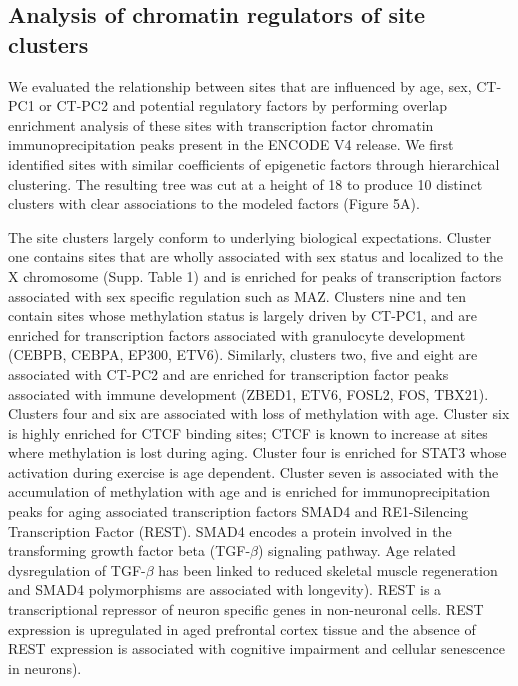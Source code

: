 \documentclass[sn-nature]{sn-jnl}
\begin{document}
{\begin{linenumbers}
\subsection{Analysis of chromatin regulators of site clusters}
We evaluated the relationship between sites that are influenced by age, sex, CT-PC1 or CT-PC2  and potential regulatory 
factors by performing overlap enrichment analysis of these sites with transcription factor chromatin immunoprecipitation 
peaks present in the ENCODE V4\cite{Davis2018-ha,ENCODE_Project_Consortium2012-oe} release. 
We first identified sites with similar coefficients of epigenetic factors through hierarchical clustering. 
The resulting tree was cut at a height of 18 to produce 10 distinct clusters with clear associations to the modeled factors (Figure 5A). 

The site clusters largely conform to underlying biological expectations. Cluster one contains sites 
that are wholly associated with sex status and localized to the X chromosome (Supp. Table 1) and is enriched for peaks of 
transcription factors associated with sex specific regulation such as MAZ\cite{Lopes-Ramos2020-ex}. 
Clusters nine and ten contain sites whose methylation status is largely driven by CT-PC1, and are enriched for 
transcription factors associated with granulocyte development (CEBPB, CEBPA, EP300, ETV6)\cite{Theilgaard-Monch2022-zw,Guerzoni2006-ii}. 
Similarly, clusters two, five and eight are associated with CT-PC2 and are enriched for 
transcription factor peaks associated with immune development (ZBED1, ETV6, FOSL2, FOS, TBX21). Clusters four and 
six are associated with loss of methylation with age. Cluster six is highly enriched for CTCF binding sites; CTCF 
is known to increase at sites where methylation is lost during aging\cite{Tharakan2020-pj}. Cluster four is enriched 
for STAT3 whose activation during exercise is age dependent\cite{Mohamed2020-he,Trenerry2008-kj}.  
Cluster seven is associated with the accumulation of methylation with age and is enriched for immunoprecipitation peaks
 for aging associated transcription factors SMAD4 and RE1-Silencing Transcription Factor (REST). SMAD4 encodes a protein 
 involved in the transforming growth factor beta (TGF-$\beta$) signaling pathway. Age related dysregulation of TGF-$\beta$ 
 has been linked to reduced skeletal muscle regeneration\cite{Carlson2009-uz,Paris2016-fo} and SMAD4 polymorphisms 
 are associated with longevity\cite{Carrieri2004-by}). REST is a transcriptional repressor of neuron specific genes in 
 non-neuronal cells\cite{Chong1995-dj,Coulson2005-pb}. REST expression is upregulated in aged prefrontal cortex 
 tissue and the absence of REST expression is associated with cognitive impairment\cite{Lu2014-dz} and 
 cellular senescence in neurons\cite{Rocchi2021-od}).


\end{linenumbers}}
\end{document}
